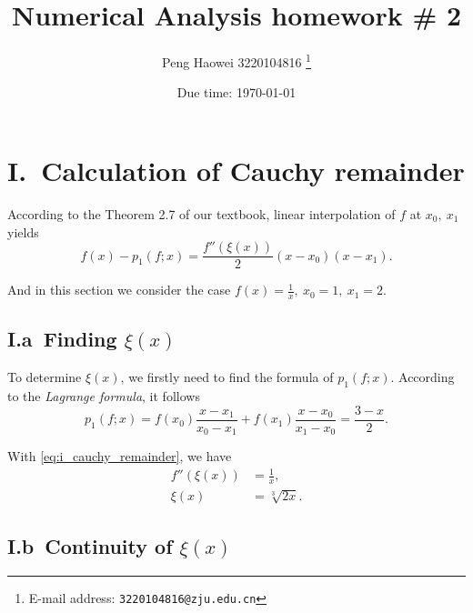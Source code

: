 \documentclass[a4paper]{article}
\begin{document}
\title{\textbf{Numerical Analysis homework \# 2}}

\author{Peng Haowei 3220104816
  \thanks{E-mail address: \texttt{3220104816@zju.edu.cn}}}

\date{Due time: \today}

\maketitle

\section*{I.\ Calculation of Cauchy remainder}

According to the Theorem 2.7 of our textbook, linear interpolation of $f$ at $x_0,\ x_1$ yields 
\begin{equation}
  f(x) - p_1(f; x) = \frac{f''(\xi(x))}{2}(x - x_0)(x - x_1). 
  \label{eq:i_cauchy_remainder}
\end{equation}

And in this section we consider the case $f(x) = \frac{1}{x},\ x_0 = 1,\ x_1 = 2$.

\subsection*{I.a\ Finding $\xi(x)$}

To determine $\xi(x)$, we firstly need to find the formula of $p_1(f; x)$. According to the \textit{Lagrange formula}, it follows
\begin{equation}
  p_1(f; x) = f(x_0) \frac{x - x_1}{x_0 - x_1} + f(x_1) \frac{x - x_0}{x_1 - x_0} = \frac{3 - x}{2}.
  \label{eq:i_p1}
\end{equation}

With \cref{eq:i_cauchy_remainder}, we have
\begin{equation}
  \begin{aligned}
    f''(\xi(x)) &= \frac{1}{x}, \\
    \xi(x) &= \sqrt[3]{2x}.
    \label{eq:i_xi}
  \end{aligned}
\end{equation}

\subsection*{I.b\ Continuity of $\xi(x)$}
\end{document}
